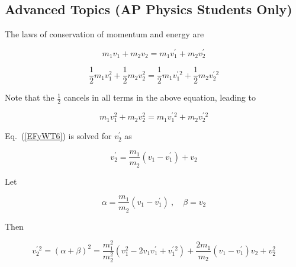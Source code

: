 \documentclass{article}
\numberwithin{equation}{section}
\numberwithin{figure}{section}
\begin{document}




\clearpage
\subsection{Advanced Topics (AP Physics Students Only)} 

The laws of conservation of momentum and energy are

\begin{equation} \label{EFyWT6}
    m_1 v_1 + m_2 v_2 = m_1 v_1^{\prime} + m_2 v_2^{\prime}
\end{equation}

\begin{equation*}
    \frac{1}{2} m_1 v_1^2 + \frac{1}{2} m_2 v_2^2 = \frac{1}{2} m_1 v_1^{\prime\,2} + \frac{1}{2} m_2 v_2^{\prime\,2}
\end{equation*}

Note that the $\frac{1}{2}$ cancels in all terms in the above equation, leading to

\begin{equation} \label{jPL9Aw}
    m_1 v_1^2 + m_2 v_2^2 = m_1 v_1^{\prime\,2} + m_2 v_2^{\prime\,2}
\end{equation}

Eq.~(\ref{EFyWT6}) is solved for $v_2^{\prime}$ as

\begin{equation} \label{7OTaEl}
    v_2^{\prime} = \frac{m_1}{m_2} \left(v_1 - v_1^{\prime}\right) + v_2
\end{equation}

Let 

\begin{equation*}
    \alpha = \frac{m_1}{m_2} \left(v_1 - v_1^{\prime}\right)\ , \quad 
    \beta = v_2
\end{equation*}

Then

\begin{equation} \label{HN7pyf}
    v_2^{\prime\,2} = (\alpha + \beta)^2 = \frac{m_1^2}{m_2^2} \left(v_1^2 - 2v_1 v_1^{\prime} + v_1^{\prime\,2}\right) +
    \frac{2 m_1}{m_2} \left(v_1 - v_1^{\prime}\right) v_2 + v_2^2
\end{equation}
\end{document}
